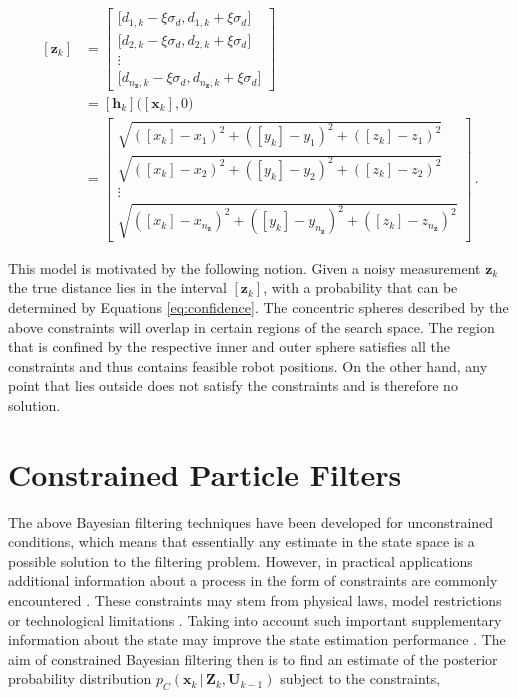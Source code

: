 \begin{equation} \label{eq:constraints}
\begin{split}
  [\bm{z}_k] &= \begin{bmatrix}
  	\big[d_{1,k} - \xi \sigma_{d}, d_{1,k} + \xi \sigma_{d}\big] \\
  	\big[d_{2,k} - \xi \sigma_{d}, d_{2,k} + \xi \sigma_{d}\big] \\
  	\vdots \\
  	\big[d_{n_{\bm{z}},k} - \xi \sigma_{d}, d_{n_{\bm{z}},k} + \xi \sigma_{d}\big]
  \end{bmatrix} \\
  &= [\bm{h}_k]\big([\bm{x}_k], 0 \big)\\
  &= \begin{bmatrix}
  	\sqrt{([x_k] - x_{1})^2 + ([y_k] - y_{1})^2 + ([z_k] - z_{1})^2} \\
  	\sqrt{([x_k] - x_{2})^2 + ([y_k] - y_{2})^2 + ([z_k] - z_{2})^2} \\
  	\vdots \\
  	\sqrt{([x_k] - x_{n_{\bm{z}}})^2 + ([y_k] - y_{n_{\bm{z}}})^2 + ([z_k] - z_{n_{\bm{z}}})^2}
  \end{bmatrix}\,.
  \end{split}
\end{equation}

\noindent
This model is motivated by the following notion. Given a noisy measurement $\bm{z}_k$ the true distance lies in the interval $[\bm{z}_k]$, with a probability that can be determined by Equations \ref{eq:confidence}. The concentric spheres described by the above constraints will overlap in certain regions of the search space. The region that is confined by the respective inner and outer sphere satisfies all the constraints and thus contains feasible robot positions. On the other hand, any point that lies outside does not satisfy the constraints and is therefore no solution. 

\section{Constrained Particle Filters}\label{sec: constraint-filters}

The above Bayesian filtering techniques have been developed for unconstrained conditions, which means that essentially any estimate in the state space is a possible solution to the filtering problem. However, in practical applications additional information about a process in the form of constraints are commonly encountered \cite{SHAO2010143}. These constraints may stem from physical laws, model restrictions or technological limitations \cite{chiang2002constrained}. Taking into account such important supplementary information about the state may improve the state estimation performance \cite{straka2012truncation}. The aim of constrained Bayesian filtering then is to find an estimate of the posterior probability distribution $p_C(\bm{x}_k\,|\,\bm{Z}_{k}, \bm{U}_{k-1})$ subject to the constraints,

